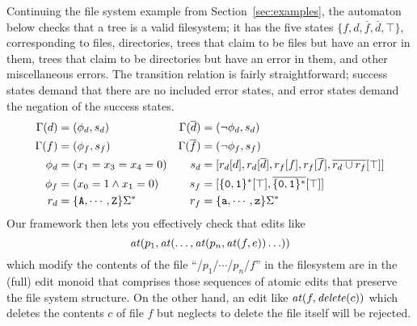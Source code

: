 Continuing the file system example from Section~\ref{sec:examples},
the automaton below checks that a tree is a valid filesystem; it
has the five states $\{f, d, \overline f, \overline d, \top\}$,
corresponding to files, directories, trees that claim to be files but have
an error in them, trees that claim to be directories but have an error in
them, and other miscellaneous errors. The transition relation is fairly
straightforward; success states demand that there are no included error
states, and error states demand the negation of the success states.
\begin{align*}
    \Gamma(d) &= (\phi_d,s_d) &
    \Gamma(\overline d) &= (\lnot \phi_d,s_d) \\
    \Gamma(f) &= (\phi_f,s_f) &
    \Gamma(\overline f) &= (\lnot \phi_f,s_f) \\
    \phi_d &= (x_1 = x_3 = x_4 = 0) &
    s_d &=
        [r_d[d]
        ,r_d[\overline d]
        ,r_f[f]
        ,r_f[\overline f]
        ,\overline{r_d\cup r_f}[\top]
        ] \\
    \phi_f &= (x_0 = 1 \land x_1 = 0) &
    s_f &=
        [          \{\mathtt{0},\mathtt{1}\}^* [\top]
        ,\overline{\{\mathtt{0},\mathtt{1}\}^*}[\top]
        ] \\
    r_d &= \{\mathtt{A},\cdots,\mathtt{Z}\}\Sigma^* &
    r_f &= \{\mathtt{a},\cdots,\mathtt{z}\}\Sigma^*
\end{align*}
Our framework then lets you effectively check that edits like
\[\mathit{at}(p_1,\mathit{at}(\ldots,\mathit{at}(p_n,\mathit{at}(f,e))\ldots))\]
which modify the contents of the file ``/$p_1$/$\cdots$/$p_n$/$f$'' in the
filesystem are in the (full) edit monoid that comprises those sequences of
atomic edits that preserve the file system structure. On the other hand, an
edit like $\mathit{at}(f,\mathit{delete}(c))$ which deletes the contents $c$ of file $f$ but
neglects to delete the file itself will be rejected.

